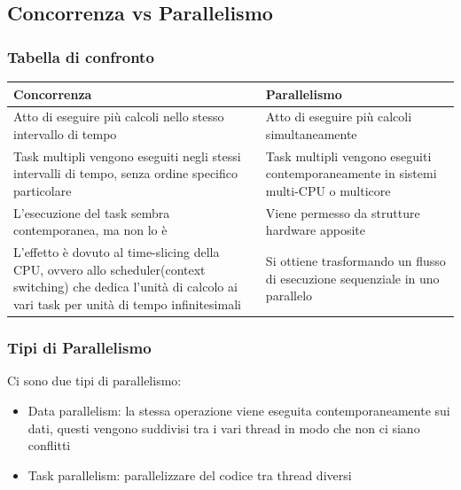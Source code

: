 \documentclass[a4paper]{article}
\begin{document}

\subsection{Concorrenza vs Parallelismo}
\subsubsection*{Tabella di confronto}
\begin{center}
\centering
\begin{tabularx}{\textwidth}{|L|L|}
	\hline
	\textbf{Concorrenza} & \textbf{Parallelismo} \\
	\hline
	Atto di eseguire più calcoli nello stesso intervallo di tempo & Atto di eseguire più calcoli simultaneamente \\
	\hline
	Task multipli vengono eseguiti negli stessi intervalli di tempo, senza ordine specifico particolare & Task multipli vengono eseguiti contemporaneamente in sistemi multi-CPU o multicore \\
	\hline
	L'esecuzione del task sembra contemporanea, ma non lo è & Viene permesso da strutture hardware apposite \\
	\hline
	L'effetto è dovuto al time-slicing della CPU, ovvero allo scheduler(context switching) che dedica l'unità di calcolo ai vari task per unità di tempo infinitesimali & Si ottiene trasformando un flusso di esecuzione sequenziale in uno parallelo \\
	\hline
\end{tabularx}
\end{center}
\subsubsection*{Tipi di Parallelismo}
Ci sono due tipi di parallelismo:
\begin{itemize}
	\item Data parallelism: la stessa operazione viene eseguita contemporaneamente sui dati, questi vengono suddivisi tra i vari thread in modo che non ci siano conflitti
	\item Task parallelism: parallelizzare del codice tra thread diversi
\end{itemize}
\end{document}
